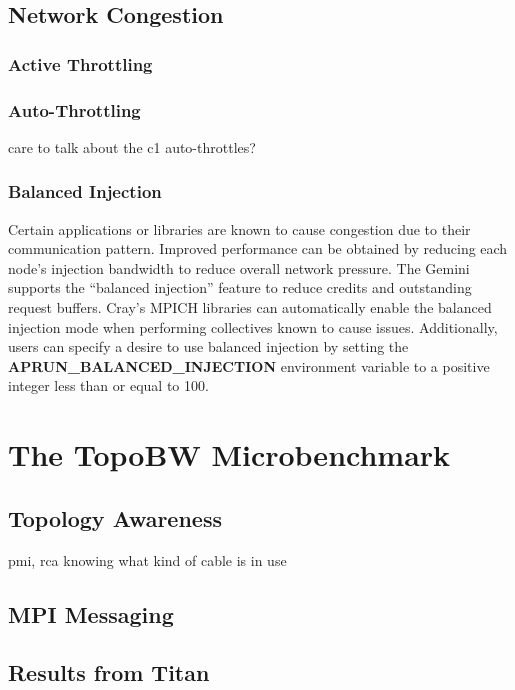\documentclass[10pt, conference, compsocconf]{IEEEtran}
\begin{document}
\subsection{Network Congestion}

\subsubsection{Active Throttling}

\subsubsection{Auto-Throttling}
care to talk about the c1 auto-throttles?

\subsubsection{Balanced Injection}

Certain applications or libraries are known to cause congestion due to their
communication pattern.  Improved performance can be obtained by reducing each
node's injection bandwidth to reduce overall network pressure.  The Gemini
supports the ``balanced injection'' feature to reduce credits and outstanding
request buffers.  Cray's MPICH libraries can automatically enable the balanced
injection mode when performing collectives known to cause issues.
Additionally, users can specify a desire to use balanced injection by setting
the \textbf{APRUN\_BALANCED\_INJECTION} environment variable to a positive
integer less than or equal to 100.

\section{The TopoBW Microbenchmark}

\subsection{Topology Awareness}
pmi, rca
knowing what kind of cable is in use

\subsection{MPI Messaging}

\subsection{Results from Titan}
\end{document}
